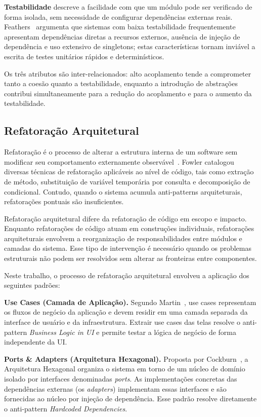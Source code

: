 \documentclass[sigconf,anonymous]{acmart}
\begin{document}
\textbf{Testabilidade} descreve a facilidade com que um módulo pode ser verificado de forma isolada, sem necessidade de configurar dependências externas reais. Feathers~\cite{Feathers2004} argumenta que sistemas com baixa testabilidade frequentemente apresentam dependências diretas a recursos externos, ausência de injeção de dependência e uso extensivo de singletons; estas características tornam inviável a escrita de testes unitários rápidos e determinísticos.

Os três atributos são inter-relacionados: alto acoplamento tende a comprometer tanto a coesão quanto a testabilidade, enquanto a introdução de abstrações contribui simultaneamente para a redução do acoplamento e para o aumento da testabilidade.


\subsection{Refatoração Arquitetural}

Refatoração é o processo de alterar a estrutura interna de um software sem modificar seu comportamento externamente observável~\cite{Fowler2018}. Fowler catalogou diversas técnicas de refatoração aplicáveis ao nível de código, tais como extração de método, substituição de variável temporária por consulta e decomposição de condicional. Contudo, quando o sistema acumula anti-patterns arquiteturais, refatorações pontuais são insuficientes.

Refatoração arquitetural difere da refatoração de código em escopo e impacto. Enquanto refatorações de código atuam em construções individuais, refatorações arquiteturais envolvem a reorganização de responsabilidades entre módulos e camadas do sistema. Esse tipo de intervenção é necessário quando os problemas estruturais não podem ser resolvidos sem alterar as fronteiras entre componentes.

Neste trabalho, o processo de refatoração arquitetural envolveu a aplicação dos seguintes padrões:

\textbf{Use Cases (Camada de Aplicação).} Segundo Martin~\cite{Martin2017}, use cases representam os fluxos de negócio da aplicação e devem residir em uma camada separada da interface de usuário e da infraestrutura. Extrair use cases das telas resolve o anti-pattern \textit{Business Logic in UI} e permite testar a lógica de negócio de forma independente da UI.

\textbf{Ports \& Adapters (Arquitetura Hexagonal).} Proposta por Cockburn~\cite{Cockburn2005}, a Arquitetura Hexagonal organiza o sistema em torno de um núcleo de domínio isolado por interfaces denominadas \textit{ports}. As implementações concretas das dependências externas (os \textit{adapters}) implementam essas interfaces e são fornecidas ao núcleo por injeção de dependência. Esse padrão resolve diretamente o anti-pattern \textit{Hardcoded Dependencies}.
\end{document}
